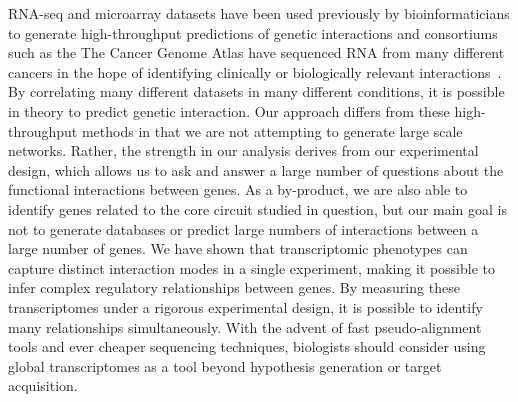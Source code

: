 \documentclass[9pt,twocolumn,twoside]{pnas-new}
\begin{document}
RNA-seq and microarray datasets have been used previously by bioinformaticians to generate high-throughput predictions of genetic interactions and consortiums such as the The Cancer Genome Atlas have sequenced RNA from many different cancers in the hope of identifying clinically or biologically relevant interactions~\cite{}. By correlating many different datasets in many different conditions, it is possible in theory to predict genetic interaction. Our approach differs from these high-throughput methods in that we are not attempting to generate large scale networks. Rather, the strength in our analysis derives from our experimental design, which allows us to ask and answer a large number of questions about the functional interactions between genes.
As a by-product, we are also able to identify genes related to the core circuit studied in question, but our main goal is not to generate databases or predict large numbers of interactions between a large number of genes. We have shown that transcriptomic phenotypes can capture distinct interaction modes in a single experiment, making it possible to infer complex regulatory relationships between genes. By measuring these transcriptomes under a rigorous experimental design, it is possible to identify many relationships simultaneously. With the advent of fast pseudo-alignment tools and ever cheaper sequencing techniques, biologists should consider using global transcriptomes as a tool beyond hypothesis generation or target acquisition.
\end{document}
